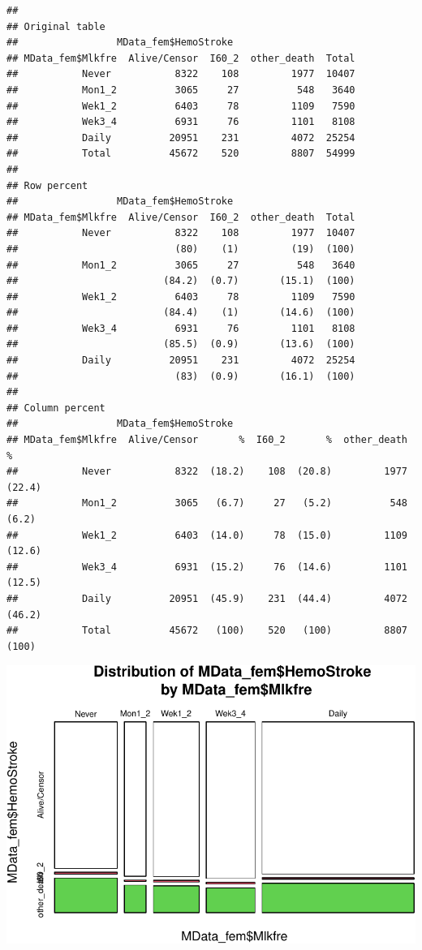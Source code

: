 \documentclass[
]{article}
\begin{document}
\begin{verbatim}
## 
## Original table 
##                 MData_fem$HemoStroke
## MData_fem$Mlkfre  Alive/Censor  I60_2  other_death  Total
##           Never           8322    108         1977  10407
##           Mon1_2          3065     27          548   3640
##           Wek1_2          6403     78         1109   7590
##           Wek3_4          6931     76         1101   8108
##           Daily          20951    231         4072  25254
##           Total          45672    520         8807  54999
## 
## Row percent 
##                 MData_fem$HemoStroke
## MData_fem$Mlkfre  Alive/Censor  I60_2  other_death  Total
##           Never           8322    108         1977  10407
##                           (80)    (1)         (19)  (100)
##           Mon1_2          3065     27          548   3640
##                         (84.2)  (0.7)       (15.1)  (100)
##           Wek1_2          6403     78         1109   7590
##                         (84.4)    (1)       (14.6)  (100)
##           Wek3_4          6931     76         1101   8108
##                         (85.5)  (0.9)       (13.6)  (100)
##           Daily          20951    231         4072  25254
##                           (83)  (0.9)       (16.1)  (100)
## 
## Column percent 
##                 MData_fem$HemoStroke
## MData_fem$Mlkfre  Alive/Censor       %  I60_2       %  other_death       %
##           Never           8322  (18.2)    108  (20.8)         1977  (22.4)
##           Mon1_2          3065   (6.7)     27   (5.2)          548   (6.2)
##           Wek1_2          6403  (14.0)     78  (15.0)         1109  (12.6)
##           Wek3_4          6931  (15.2)     76  (14.6)         1101  (12.5)
##           Daily          20951  (45.9)    231  (44.4)         4072  (46.2)
##           Total          45672   (100)    520   (100)         8807   (100)
\end{verbatim}

\includegraphics{traditionalPH_files/figure-latex/unnamed-chunk-26-1.pdf}
\end{document}
